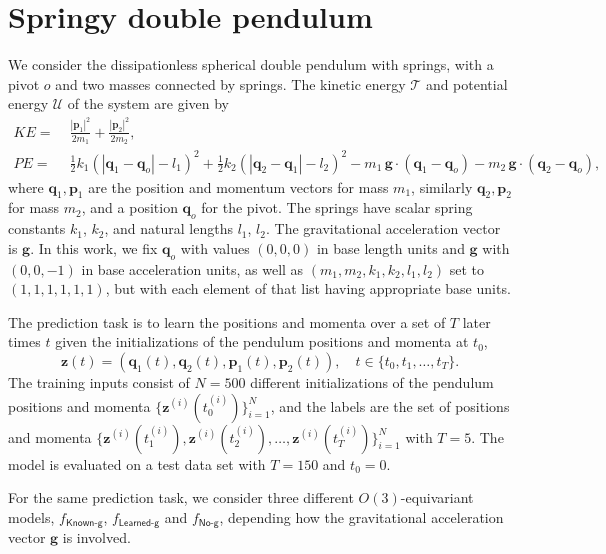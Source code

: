 \documentclass{article} %
\renewcommand{\mathcal}[1]{\mathscr{#1}} %
\begin{document}
\section{Springy double pendulum}\label{app:pendulum}
We consider the dissipationless spherical double pendulum with springs, with a pivot $o$ and two masses connected by springs. The kinetic energy $\mathcal{T}$ and potential energy $\mathcal{U}$ of the system are given by
\begin{align}
    KE =&\;\frac{|\mathbf{p}_1|^2}{2m_1} +\frac{|\mathbf{p}_2|^2}{2m_2}, \label{eq:energy_T}\\
    PE =&\;\frac12 k_1(|\mathbf{q}_1-\mathbf{q}_o|-l_1)^2 + \frac12 k_2(|\mathbf{q}_2-\mathbf{q}_1|-l_2)^2 
    -m_1\,\mathbf{g}\cdot (\mathbf{q}_1-\mathbf{q}_o)- m_2 \,\mathbf{g}\cdot  (\mathbf{q}_2-\mathbf{q}_o), \label{eq:energy_U}
\end{align}
where $\mathbf{q}_1, \mathbf{p}_1$ are the position and momentum vectors for mass $m_1$, similarly $\mathbf{q}_2, \mathbf{p}_2$ for mass $m_2$, and a position $\mathbf{q}_o$ for the pivot. The springs have scalar spring constants $k_1$, $k_2$, and natural lengths $l_1$, $l_2$. The gravitational acceleration vector is $\mathbf{g}$. 
In this work, we fix $\mathbf{q}_o$ with values $(0,0,0)$ in base length units and $\mathbf{g}$ with $(0,0,-1)$ in base acceleration units, as well as $(m_1, m_2, k_1, k_2, l_1, l_2)$ set to $(1,1,1,1,1,1)$, but with each element of that list having appropriate base units. 

The prediction task is to learn the positions and momenta over a set of $T$ later times $t$ given the initializations of the pendulum positions and momenta at $t_0$,
\begin{equation}
\mathbf{z}(t)=(\mathbf{q}_1(t),\mathbf{q}_2(t),\mathbf{p}_1(t),\mathbf{p}_2(t)), \quad t\in\{t_0, t_1,\ldots,t_T\}. 
\end{equation}
The training inputs consist of $N=500$ different initializations of the pendulum positions and momenta $\{\mathbf{z}^{(i)}(t_0^{(i)})\}_{i=1}^N$, and the labels are the set of positions and momenta $\{\mathbf{z}^{(i)}(t_1^{(i)}),\mathbf{z}^{(i)}(t_2^{(i)}),\ldots,\mathbf{z}^{(i)}(t_T^{(i)})\}_{i=1}^N$ with $T=5$.
The model is evaluated on a test data set with $T=150$ and $t_0=0$. 

For the same prediction task, we consider three different $O(3)$-equivariant models, $f_{\textsf{Known-g}}$, $f_{\textsf{Learned-g}}$ and $f_{\textsf{No-g}}$, depending how the gravitational acceleration vector $\mathbf{g}$ is involved. 
\end{document}
